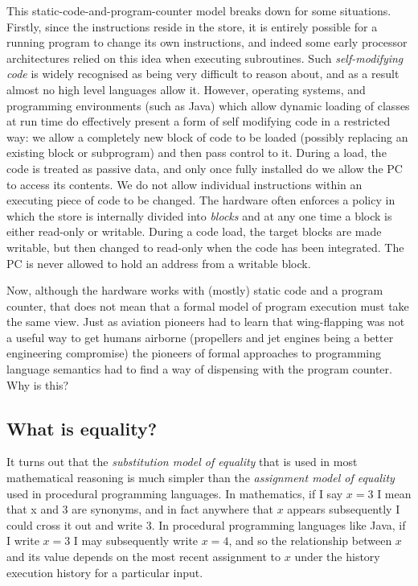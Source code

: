 \documentclass[11pt]{book}
\begin{document}
This static-code-and-program-counter model breaks down for some situations. Firstly, since the instructions reside in the store, it is entirely possible for a running program to change its own instructions, and indeed some early processor architectures relied on this idea when executing subroutines. Such {\em self-modifying code} is widely recognised as being very difficult to reason about, and as a result almost no high level languages allow it. However, operating systems, and programming environments (such as Java) which allow dynamic loading of classes at run time do effectively present a form of self modifying code in a restricted way: we allow a completely new block of code to be loaded (possibly replacing an existing block or subprogram) and then pass control to it. During a load, the code is treated as passive data, and only once fully installed do we allow the PC to access its contents. We do not allow individual instructions within an executing piece of code to be changed. The hardware often enforces a policy in which the store is internally divided into 
{\em blocks} and at any one time a block is either read-only or writable. During a code load, the target blocks are made writable, but then changed to read-only when the code has been integrated. The PC is never allowed to hold an address from a writable block.

Now, although the hardware works with (mostly) static code and a program counter, that does not mean that a formal model of program execution must take the same view. Just as aviation pioneers had to learn that wing-flapping was not a useful way to get humans airborne (propellers and jet engines being a better engineering compromise) the pioneers of formal approaches to programming language semantics had to find a way of dispensing with the program counter. Why is this?

\subsection{What is equality?}
It turns out that the {\em substitution model of equality} that is used in most mathematical reasoning is much simpler than the {\em assignment model of equality} used in procedural programming languages. In mathematics, if I say $x = 3$ I mean that x and 3 are synonyms, and in fact anywhere that $x$ appears subsequently I could cross it out and write 3. In procedural programming languages like Java, if I write $x = 3$ I may subsequently write $ x= 4$, and so the relationship between $x$ and its value depends on the most recent assignment to $x$ under the history execution history  for a particular input. 
\end{document}
